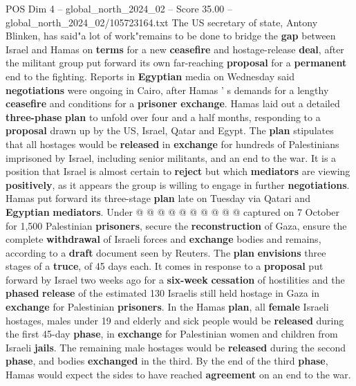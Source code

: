 \begin{textsample}{POS Dim 4 – global\_north\_2024\_02 – Score 35.00 – global\_north\_2024\_02/105723164.txt}  \label{ex:f4_pos_181}
The US secretary of state, Antony Blinken, has said"a lot of work"remains to be done to bridge the \textbf{gap} between Israel and Hamas on \textbf{terms} for a new \textbf{ceasefire} and hostage-release \textbf{deal}, after the militant group put forward its own far-reaching \textbf{proposal} for a \textbf{permanent} end to the fighting.
Reports in \textbf{Egyptian} media on Wednesday said \textbf{negotiations} were ongoing in Cairo, after Hamas ' s demands for a lengthy \textbf{ceasefire} and conditions for a \textbf{prisoner} \textbf{exchange}.
Hamas laid out a detailed \textbf{three-phase} \textbf{plan} to unfold over four and a half months, responding to a \textbf{proposal} drawn up by the US, Israel, Qatar and Egypt.
The \textbf{plan} stipulates that all hostages would be \textbf{released} in \textbf{exchange} for hundreds of Palestinians imprisoned by Israel, including senior militants, and an end to the war.
It is a position that Israel is almost certain to \textbf{reject} but which \textbf{mediators} are viewing \textbf{positively}, as it appears the group is willing to engage in further \textbf{negotiations}.
Hamas put forward its three-stage \textbf{plan} late on Tuesday via Qatari and \textbf{Egyptian} \textbf{mediators}.
Under @ @ @ @ @ @ @ @ @ @ captured on 7 October for 1,500 Palestinian \textbf{prisoners}, secure the \textbf{reconstruction} of Gaza, ensure the complete \textbf{withdrawal} of Israeli forces and \textbf{exchange} bodies and remains, according to a \textbf{draft} document seen by Reuters.
The \textbf{plan} \textbf{envisions} three stages of a \textbf{truce}, of 45 days each.
It comes in response to a \textbf{proposal} put forward by Israel two weeks ago for a \textbf{six-week} \textbf{cessation} of hostilities and the \textbf{phased} \textbf{release} of the estimated 130 Israelis still held hostage in Gaza in \textbf{exchange} for Palestinian \textbf{prisoners}.
In the Hamas \textbf{plan}, all \textbf{female} Israeli hostages, males under 19 and elderly and sick people would be \textbf{released} during the first 45-day \textbf{phase}, in \textbf{exchange} for Palestinian women and children from Israeli \textbf{jails}.
The remaining male hostages would be \textbf{released} during the second \textbf{phase}, and bodies \textbf{exchanged} in the third.
By the end of the third \textbf{phase}, Hamas would expect the sides to have reached \textbf{agreement} on an end to the war.

\end{textsample}
